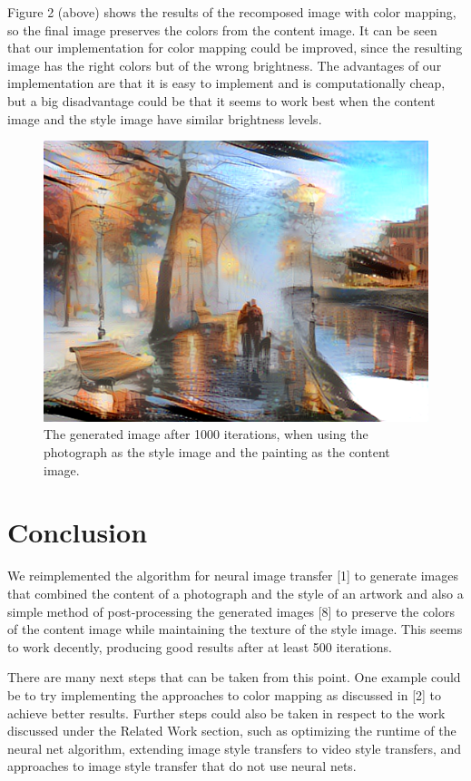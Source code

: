 \documentclass[10pt,twocolumn,letterpaper]{article}
\begin{document}
Figure 2 (above) shows the results of the recomposed image with color mapping, so the final image preserves the colors from the content image. It can be seen that our implementation for color mapping could be improved, since the resulting image has the right colors but of the wrong brightness. The advantages of our implementation are that it is easy to implement and is computationally cheap, but a big disadvantage could be that it seems to work best when the content image and the style image have similar brightness levels.

\begin{figure}[t]
\begin{center}
\includegraphics[width=0.8\linewidth]{brooklyn_night/out.png}
\end{center}
   \caption{The generated image after 1000 iterations, when using the photograph as the style image and the painting as the content image.}
\label{fig:long}
\label{fig:onecol}
\end{figure}

\section{Conclusion}

We reimplemented the algorithm for neural image transfer [1] to generate images that combined the content of a photograph and the style of an artwork and also a simple method of post-processing the generated images [8] to preserve the colors of the content image while maintaining the texture of the style image. This seems to work decently, producing good results after at least 500 iterations. 

There are many next steps that can be taken from this point. One example could be to try implementing the approaches to color mapping as discussed in [2] to achieve better results. Further steps could also be taken in respect to the work discussed under the Related Work section, such as optimizing the runtime of the neural net algorithm, extending image style transfers to video style transfers, and approaches to image style transfer that do not use neural nets.
\end{document}
